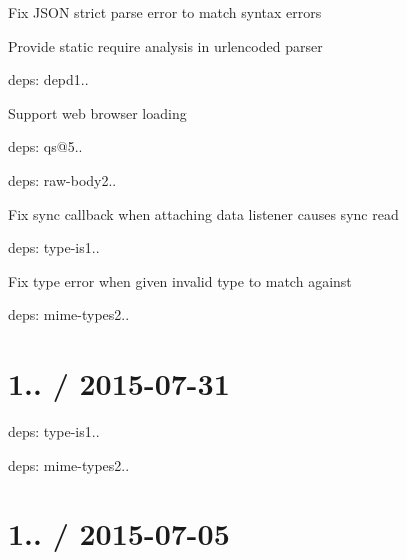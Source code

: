 \begin{DoxyItemize}
\item Fix J\+S\+ON strict parse error to match syntax errors
\item Provide static {\ttfamily require} analysis in {\ttfamily urlencoded} parser
\item deps\+: depd1..
\begin{DoxyItemize}
\item Support web browser loading
\end{DoxyItemize}
\item deps\+: qs@5..
\item deps\+: raw-\/body2..
\begin{DoxyItemize}
\item Fix sync callback when attaching data listener causes sync read
\end{DoxyItemize}
\item deps\+: type-\/is1..
\begin{DoxyItemize}
\item Fix type error when given invalid type to match against
\item deps\+: mime-\/types2..
\end{DoxyItemize}
\end{DoxyItemize}

\section*{1.. / 2015-\/07-\/31 }


\begin{DoxyItemize}
\item deps\+: type-\/is1..
\begin{DoxyItemize}
\item deps\+: mime-\/types2..
\end{DoxyItemize}
\end{DoxyItemize}

\section*{1.. / 2015-\/07-\/05 }


